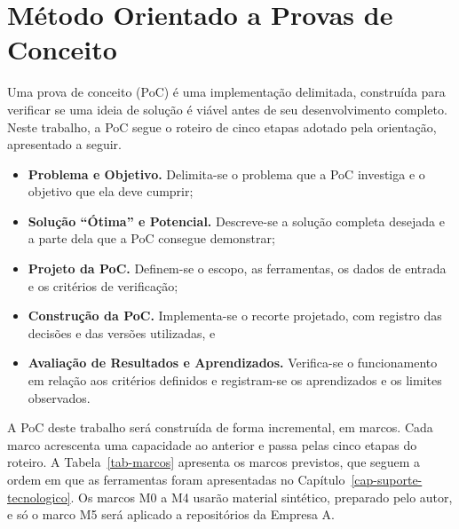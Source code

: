 \section{Método Orientado a Provas de Conceito}
\label{met-poc}

Uma prova de conceito (PoC) é uma implementação delimitada, construída para verificar se uma ideia de solução é viável antes de seu desenvolvimento completo. Neste trabalho, a PoC segue o roteiro de cinco etapas adotado pela orientação, apresentado a seguir.

\begin{itemize}
    \item \textbf{Problema e Objetivo.} Delimita-se o problema que a PoC investiga e o objetivo que ela deve cumprir;
    \item \textbf{Solução ``Ótima'' e Potencial.} Descreve-se a solução completa desejada e a parte dela que a PoC consegue demonstrar;
    \item \textbf{Projeto da PoC.} Definem-se o escopo, as ferramentas, os dados de entrada e os critérios de verificação;
    \item \textbf{Construção da PoC.} Implementa-se o recorte projetado, com registro das decisões e das versões utilizadas, e
    \item \textbf{Avaliação de Resultados e Aprendizados.} Verifica-se o funcionamento em relação aos critérios definidos e registram-se os aprendizados e os limites observados.
\end{itemize}

A PoC deste trabalho será construída de forma incremental, em marcos. Cada marco acrescenta uma capacidade ao anterior e passa pelas cinco etapas do roteiro. A Tabela~\ref{tab-marcos} apresenta os marcos previstos, que seguem a ordem em que as ferramentas foram apresentadas no Capítulo~\ref{cap-suporte-tecnologico}. Os marcos M0 a M4 usarão material sintético, preparado pelo autor, e só o marco M5 será aplicado a repositórios da Empresa A.


